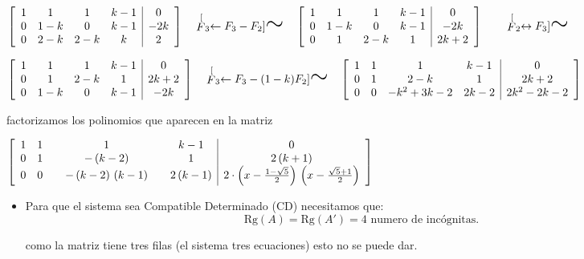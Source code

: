 \documentclass[11pt]{article}
\newcommand{\semejante}[1]{\stackrel[#1]{}{\text{\huge$\sim$}}}%
\begin{document}
\begin{enumerate}[\hspace{-5mm} 1) ]
\begin{enumerate}[a)]
\medskip

$
\left[
\begin{array}{rccc|c}
1 & 1 & 1 & k-1 & 0\\
0 & 1-k & 0 & k-1 & -2 k\\
0 & 2-k & 2-k & k & 2
\end{array}
\right]
\quad 
\semejante{F_3 \leftarrow F_3 -  F_2  }
\quad 
\left[
\begin{array}{rccc|c}
1 & 1 & 1 & k-1 & 0\\
0 & 1-k & 0 & k-1 & -2 k\\
0 & 1 & 2-k & 1 & 2 k+2
\end{array}
\right]\qquad 
\semejante{F_2 \leftrightarrow  F_3  }$
 
\medskip

$
\left[
\begin{array}{rccc|c}
1 & 1 & 1 & k-1 & 0\\
0 & 1 & 2-k & 1 & 2 k+2\\
0 & 1-k & 0 & k-1 & -2 k
\end{array}
\right]
\quad 
\semejante{ F_3 \leftarrow F_3 - (1-k)  F_2  }
\quad 
\left[
\begin{array}{rccc|c}
1 & 1 & 1 & k-1 & 0\\
0 & 1 & 2-k & 1 & 2 k+2\\
0 & 0 & -{{k}^{2}}+3 k-2 & 2 k-2 & 2 {{k}^{2}}-2 k-2
\end{array}
\right]$
 
\medskip


factorizamos los polinomios que aparecen en la matriz

\hfill$\left[
\begin{array}{rc@{\qquad}c@{\qquad}c|c}
1 & 1 & 1 & k-1 & 0\\
0 & 1 & -\left( k-2\right)  & 1 & 2 \left( k+1\right) \\
0 & 0 & -\left( k-2\right) \, \left( k-1\right)  & 2 \left( k-1\right)  & 2 \cdot\left( x-\frac{1-\sqrt{5}}{2}\right) \, \left( x-\frac{\sqrt{5}+1}{2}\right) 
\end{array}
\right]$





\begin{itemize}
\item Para que el sistema sea Compatible Determinado (CD) necesitamos que:
\[
\text{Rg}(A) = \text{Rg}(A') = 4 \text{ numero de incógnitas.}
\]

como la matriz tiene tres filas (el sistema tres ecuaciones) esto no se puede dar.




\end{itemize}
\end{enumerate}
\end{enumerate}
\end{document}
